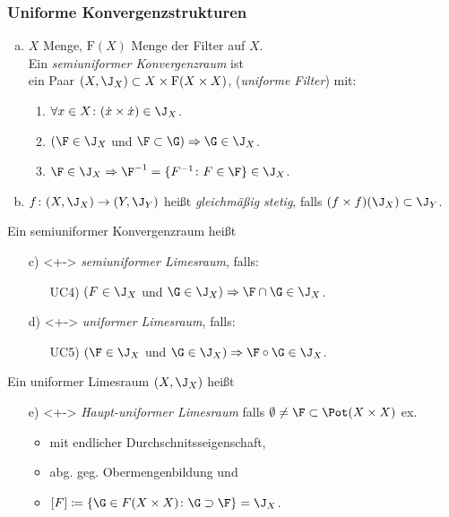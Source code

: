 \begin{frame}
  \frametitle{Uniforme Konvergenzstrukturen}
  \begin{enumerate}[a)]
    \item<+-> $X$ Menge, $\mathrm{F}(X)$ Menge der Filter auf $X$.\\
      Ein \emph{semiuniformer Konvergenzraum} ist \\
      ein Paar $(X, \J_X) \subset X \times \mathrm{F}(X \times X)$, (\emph{uniforme Filter}) mit: 
      \begin{enumerate}[UC1)]
         \item $\forall x \in X \colon (\dot x \times \dot x) \in \J_X$.
         \item $(\F \in \J_X$ und $\F \subset \G) \Rightarrow \G \in \J_X$.
         \item $\F \in \J_X \Rightarrow \F^{-1} = \{F^{-1} \colon F \in \F\} \in \J_X$.
      \end{enumerate}
    \item<+-> $f \colon (X, \J_X) \to (Y, \J_Y)$ heißt \emph{gleichmäßig stetig}, falls $(f \times f)(\J_X) \subset \J_Y$.
  \end{enumerate}
  \pause
  Ein semiuniformer Konvergenzraum heißt 
\begin{enumerate}[a)]
  \item[c)]<+-> \emph{semiuniformer Limesraum}, falls:
    \begin{enumerate}[UC1)]
      \item[UC4)] $(F \in \J_X$ und $\G \in \J_X) \Rightarrow \F \cap \G \in \J_X$.
    \end{enumerate}
  \item[d)]<+-> \emph{uniformer Limesraum}, falls:
    \begin{enumerate}[UC1)]
      \item[UC5)] $(\F \in \J_X$ und $\G \in \J_X) \Rightarrow \F \circ \G \in \J_X$.
    \end{enumerate}
  \end{enumerate}
  \pause
  Ein uniformer Limesraum $(X, \J_X)$ heißt
  \begin{enumerate}[a)]
    \item[e)]<+-> \emph{Haupt-uniformer Limesraum} falls $\emptyset \neq \F \subset \Pot(X \times X)$ ex.
      \begin{itemize}
        \item  mit endlicher Durchschnitsseigenschaft, 
        \item abg. geg. Obermengenbildung und 
        \item $[F] \coloneqq \{\G \in F(X\times X) \colon \G \supset \F \}= \J_X$.
      \end{itemize}
  \end{enumerate}
\end{frame}

